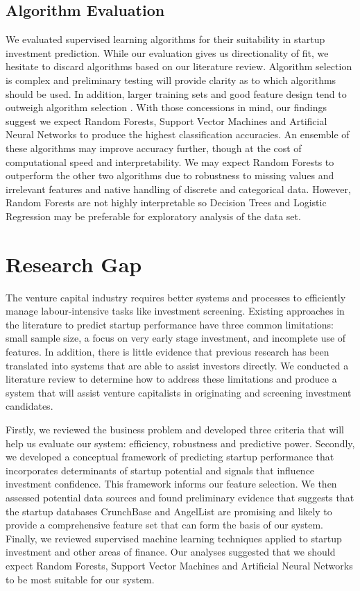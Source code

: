 \documentclass[../thesis/thesis.tex]{subfiles}
\begin{document}
\begin{refsection}
\subsection{Algorithm Evaluation}

We evaluated supervised learning algorithms for their suitability in startup investment prediction. While our evaluation gives us directionality of fit, we hesitate to discard algorithms based on our literature review. Algorithm selection is complex and preliminary testing will provide clarity as to which algorithms should be used. In addition, larger training sets and good feature design tend to outweigh algorithm selection \cite{caruana2008}. With those concessions in mind, our findings suggest we expect Random Forests, Support Vector Machines and Artificial Neural Networks to produce the highest classification accuracies. An ensemble of these algorithms may improve accuracy further, though at the cost of computational speed and interpretability. We may expect Random Forests to outperform the other two algorithms due to robustness to missing values and irrelevant features and native handling of discrete and categorical data. However, Random Forests are not highly interpretable so Decision Trees and Logistic Regression may be preferable for exploratory analysis of the data set.

\section{Research Gap}

The venture capital industry requires better systems and processes to efficiently manage labour-intensive tasks like investment screening. Existing approaches in the literature to predict startup performance have three common limitations: small sample size, a focus on very early stage investment, and incomplete use of features. In addition, there is little evidence that previous research has been translated into systems that are able to assist investors directly. We conducted a literature review to determine how to address these limitations and produce a system that will assist venture capitalists in originating and screening investment candidates.

Firstly, we reviewed the business problem and developed three criteria that will help us evaluate our system: efficiency, robustness and predictive power. Secondly, we developed a conceptual framework of predicting startup performance that incorporates determinants of startup potential and signals that influence investment confidence. This framework informs our feature selection. We then assessed potential data sources and found preliminary evidence that suggests that the startup databases CrunchBase and AngelList are promising and likely to provide a comprehensive feature set that can form the basis of our system. Finally, we reviewed supervised machine learning techniques applied to startup investment and other areas of finance. Our analyses suggested that we should expect Random Forests, Support Vector Machines and Artificial Neural Networks to be most suitable for our system.


\end{refsection}
\end{document}
